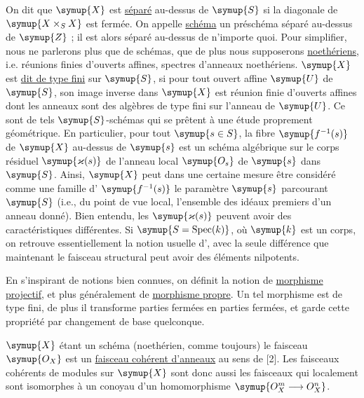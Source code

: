 On dit que $\symup{X}$ est \uline{séparé} au-dessus de $\symup{S}$ si la diagonale de
$\symup{X\times_S X}$ est fermée. On appelle \uline{schéma} un préschéma séparé
au-dessus de $\symup{Z}$ ; il est alors séparé au-dessus de n'importe quoi.
Pour simplifier, nous ne parlerons plus que de schémas, que de plus nous
supposerons \uline{noethériens}, i.e. réunions finies d'ouverts affines, spectres
d'anneaux noethériens. $\symup{X}$ est \uline{dit de type fini} sur $\symup{S}$, si pour tout
ouvert affine $\symup{U}$ de $\symup{S}$, son image inverse dans $\symup{X}$ est réunion finie d'ouverts
affines dont les anneaux sont des algèbres de type fini sur l'anneau de $\symup{U}$. Ce
sont de tels $\symup{S}$-schémas qui se prêtent à une étude proprement géométrique. En
particulier, pour tout $\symup{s\in S}$, la fibre $\symup{f^{-1}(s)}$ de $\symup{X}$ au-dessus de $\symup{s}$
est un schéma algébrique sur le corps résiduel $\symup{\varkappa(s)}$ de l'anneau local
$\symup{O_s}$ de $\symup{s}$ dans $\symup{S}$. Ainsi, $\symup{X}$ peut dans une certaine mesure être
considéré comme une famille d' $\symup{f^{-1}(s)}$ le paramètre
$\symup{s}$ parcourant $\symup{S}$ (i.e., du point de vue local, l'ensemble des idéaux premiers
d'un anneau donné). Bien entendu, les $\symup{\varkappa(s)}$ peuvent avoir des
caractéristiques différentes. Si $\symup{S=\operatorname{Spec}(k)}$, où $\symup{k}$ est un
corps, on retrouve essentiellement la notion usuelle d',
avec la seule différence que maintenant le faisceau structural peut avoir des
éléments nilpotents.

En s'inspirant de notions bien connues, on définit la notion de
\uline{morphisme projectif}, et plus généralement de \uline{morphisme propre}. Un
tel morphisme est de type fini, de plus il transforme parties fermées en
parties fermées, et garde cette propriété par changement de base quelconque.

$\symup{X}$ étant un schéma (noethérien, comme toujours) le faisceau $\symup{O_X}$ est un
\uline{faisceau cohérent d'anneaux} au sens de [2]. Les faisceaux cohérents de
modules sur $\symup{X}$ sont donc aussi les faisceaux qui localement sont isomorphes à
un conoyau d'un homomorphisme $\symup{O_X^{m}\longrightarrow O_X^{n}}$.



